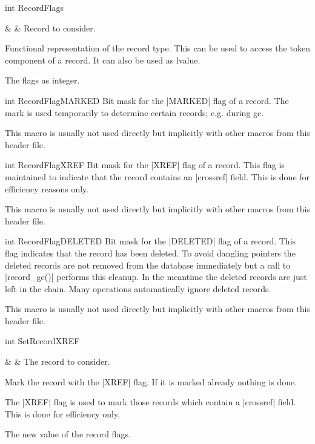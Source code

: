 \begin{Macro}{int }{RecordFlags}
  \begin{Arguments}
    &  & Record to consider.\\
  \end{Arguments}%
  Functional representation of the record type.  This
  can be used to access the token component of a
  record. It can also be used as lvalue. 
  \begin{Result}
    The flags as integer.
  \end{Result}
\end{Macro}
\begin{Constant}{int }{RecordFlagMARKED}
  Bit mask for the |MARKED| flag of a record.  The mark
  is used temporarily to determine certain records;
  e.g. during gc.
  
  This macro is usually not used directly but implicitly
  with other macros from this header file. 
\end{Constant}
\begin{Constant}{int }{RecordFlagXREF}
  Bit mask for the |XREF| flag of a record. This flag is
  maintained to indicate that the record contains an
  |crossref| field. This is done for efficiency reasons
  only. 
  
  This macro is usually not used directly but implicitly
  with other macros from this header file. 
\end{Constant}
\begin{Constant}{int }{RecordFlagDELETED}
  Bit mask for the |DELETED| flag of a record.  This
  flag indicates that the record has been deleted.  To
  avoid dangling pointers the deleted records are not
  removed from the database immediately but a call to
  |record_gc()| performs this cleanup. In the meantime
  the deleted records are just left in the chain. Many
  operations automatically ignore deleted records.
  
  This macro is usually not used directly but implicitly
  with other macros from this header file. 
\end{Constant}
\begin{Macro}{int }{SetRecordXREF}
  \begin{Arguments}
    &  & The record to consider.\\
  \end{Arguments}%
  Mark the record with the |XREF| flag. If it is marked
  already nothing is done.
  
  The |XREF| flag is used to mark those records which
  contain a |crossref| field. This is done for
  efficiency only.
  \begin{Result}
    The new value of the record flags.
  \end{Result}
\end{Macro}
